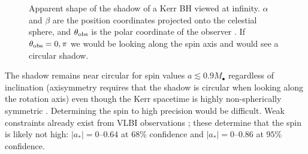 \begin{figure}%
  \begin{center}
    \quad
    \quad
    \\
    \quad
    \quad
    \\
    \quad  
    \caption{Apparent shape of the shadow of a Kerr BH viewed at infinity. $\alpha$ and $\beta$ are the position coordinates projected onto the celestial sphere, and $\theta_\mathrm{obs}$ is the polar coordinate of the observer \citep[section 63]{Chandrasekhar1992}. If $\theta_\mathrm{obs} = 0, \pi$ we would be looking along the spin axis and would see a circular shadow.} 
    \label{fig:Shadow}
  \end{center}
\end{figure}
The shadow remains near circular for spin values $a \lesssim 0.9 M_\bullet$ regardless of inclination (axisymmetry requires that the shadow is circular when looking along the rotation axis) even though the Kerr spacetime is highly non-spherically symmetric \citep{Johannsen2010b}. Determining the spin to high precision would be difficult. Weak constraints already exist from VLBI observations \citep{Broderick2009a,Broderick2011}; these determine that the spin is likely not high: $|a_\ast| = 0$--$0.64$ at $68\%$ confidence and $|a_\ast| = 0$--$0.86$ at $95\%$ confidence.

